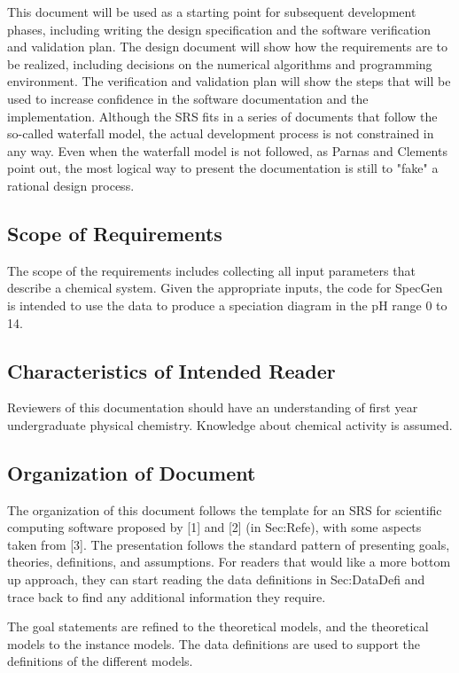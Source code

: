 \documentclass[12pt]{article}
\begin{document}
This document will be used as a starting point for subsequent development phases, including writing the design specification and the software verification and validation plan. The design document will show how the requirements are to be realized, including decisions on the numerical algorithms and programming environment. The verification and validation plan will show the steps that will be used to increase confidence in the software documentation and the implementation. Although the SRS fits in a series of documents that follow the so-called waterfall model, the actual development process is not constrained in any way. Even when the waterfall model is not followed, as Parnas and Clements point out, the most logical way to present the documentation is still to "fake" a rational design process.

\subsection{Scope of Requirements} 
The scope of the requirements includes collecting all input parameters that describe a chemical system. Given the appropriate inputs, the code for SpecGen is intended to use the data to produce a speciation diagram in the pH range 0 to 14. 

\subsection{Characteristics of Intended Reader} 
Reviewers of this documentation should have an understanding of first year undergraduate physical chemistry.  Knowledge about chemical activity is assumed.


\subsection{Organization of Document}
The organization of this document follows the template for an SRS for scientific computing software proposed by [1] and [2] (in Sec:Refe), with some aspects taken from [3]. The presentation follows the standard pattern of presenting goals, theories, definitions, and assumptions. For readers that would like a more bottom up approach, they can start reading the data definitions in Sec:DataDefi and trace back to find any additional information they require.

The goal statements are refined to the theoretical models, and the theoretical models to the instance models. The data definitions are used to support the definitions of the different models.
\end{document}
